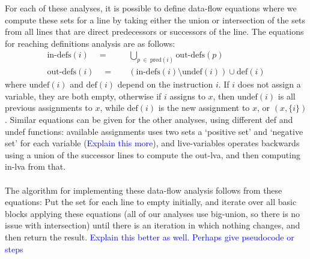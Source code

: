 \documentclass[12pt,twoside,notitlepage]{report}
\newcommand\note[1]{\textcolor{blue}{#1}}
\begin{document}
For each of these analyses, it is possible to define data-flow equations where we compute these sets for a line by taking either the union or intersection of the sets from all lines that are direct predecessors or successors of the line. The equations for reaching definitions analysis are as follows:
\begin{align*}
\text{in-defs}(i) \quad=&\quad \bigcup_{p\ \in\ \text{pred}(i)} \text{out-defs}(p) \\
\text{out-defs}(i) \quad=&\quad (\text{in-defs}(i) \setminus \text{undef}(i)) \cup \text{def}(i)
\end{align*}
where $\text{undef}(i)$ and $\text{def}(i)$ depend on the instruction $i$. If $i$ does not assign a variable, they are both empty, otherwise if $i$ assigns to $x$, then $\text{undef}(i)$ is all previous assignments to $x$, while $\text{def}(i)$ is the new assignment to $x$, or $(x, \{i\})$. Similar equations can be given for the other analyses, using different def and undef functions: available assignments uses two sets a `positive set' and `negative set' for each variable (\note{Explain this more}), and live-variables operates backwards using a union of the successor lines to compute the out-lva, and then computing in-lva from that.
\\\\
The algorithm for implementing these data-flow analysis follows from these equations: Put the set for each line to empty initially, and iterate over all basic blocks applying these equations (all of our analyses use big-union, so there is no issue with intersection) until there is an iteration in which nothing changes, and then return the result. \note{Explain this better as well. Perhaps give pseudocode or steps}
\end{document}
